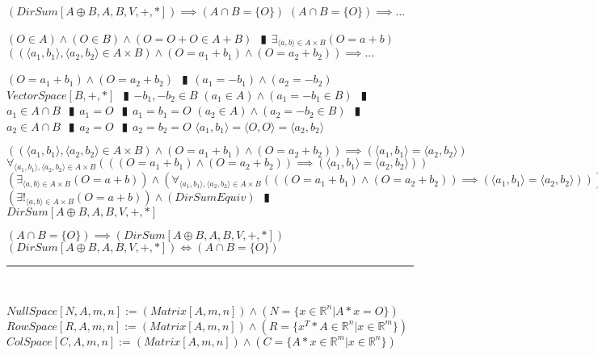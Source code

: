 \documentclass{book}
\newcommand{\abr}{:=}
\newcommand{\pipe}{$\phantom{(}\vrectangleblack\phantom{)}$}
\newcommand{\pr}[1]{\left(#1\right)}
\begin{document}
\begin{shaded}
\begin{enumerate}
    \lit $(DirSum[A \oplus B, A, B, V, +, *]) \implies (A \cap B = \{O\})$
    \lit $(A \cap B = \{O\}) \implies \ldots$
    \begin{enumerate}
      \lit $(O \in A) \land (O \in B) \land (O = O + O \in A + B)$ \pipe $\exists_{\langle a, b \rangle \in A \times B}(O = a + b)$
      \lit $\pr{(\langle a_1, b_1 \rangle, \langle a_2, b_2 \rangle \in A \times B) \land (O = a_1 + b_1) \land (O = a_2 + b_2)} \implies \ldots$
      \begin{enumerate}
        \lit $(O = a_1 + b_1) \land (O = a_2 + b_2)$ \pipe $(a_1 = -b_1) \land (a_2 = -b_2)$
        \lit $VectorSpace[B, +, *]$ \pipe $-b_1, -b_2 \in B$
        \lit $(a_1 \in A) \land (a_1 = -b_1 \in B)$ \pipe $a_1 \in A \cap B$ \pipe $a_1 = O$ \pipe $a_1 = b_1 = O$
        \lit $(a_2 \in A) \land (a_2 = -b_2 \in B)$ \pipe $a_2 \in A \cap B$ \pipe $a_2 = O$ \pipe $a_2 = b_2 = O$
        \lit $\langle a_1, b_1 \rangle = \langle O, O \rangle = \langle a_2, b_2 \rangle$
      \end{enumerate}
      \lit $\pr{(\langle a_1, b_1 \rangle, \langle a_2, b_2 \rangle \in A \times B) \land (O = a_1 + b_1) \land (O = a_2 + b_2)} \implies (\langle a_1, b_1 \rangle = \langle a_2, b_2 \rangle)$
      \lit $\forall_{\langle a_1, b_1 \rangle, \langle a_2, b_2 \rangle \in A \times B}\pr{\pr{(O = a_1 + b_1) \land (O = a_2 + b_2)} \implies (\langle a_1, b_1 \rangle = \langle a_2, b_2 \rangle)}$
      \lit $\pr{\exists_{\langle a, b \rangle \in A \times B}(O = a + b)} \land \pr{\forall_{\langle a_1, b_1 \rangle, \langle a_2, b_2 \rangle \in A \times B}\pr{\pr{(O = a_1 + b_1) \land (O = a_2 + b_2)} \implies (\langle a_1, b_1 \rangle = \langle a_2, b_2 \rangle)}}$
      \lit $\pr{\exists!_{\langle a, b \rangle \in A \times B}(O = a + b)} \land (DirSumEquiv)$ \pipe $DirSum[A \oplus B, A, B, V, +, *]$
    \end{enumerate}
    \lit $(A \cap B = \{O\}) \implies (DirSum[A \oplus B, A, B, V, +, *])$
    \lit $(DirSum[A \oplus B, A, B, V, +, *]) \iff (A \cap B = \{O\})$
  \end{enumerate} \vspace{.75mm} \hrule \vspace{.75mm} \ \\
\end{shaded} %

$NullSpace[N, A, m, n] \abr (Matrix[A, m, n]) \land (N = \{x \in \mathbb{R}^n | A * x = O\})$ \\  %
$RowSpace[R, A, m, n] \abr (Matrix[A, m, n]) \land (R = \{x^T * A \in \mathbb{R}^n | x \in \mathbb{R}^m\})$ \\  %
$ColSpace[C, A, m, n] \abr (Matrix[A, m, n]) \land (C = \{A * x \in \mathbb{R}^m | x \in \mathbb{R}^n\})$ \\  %
\end{document}
